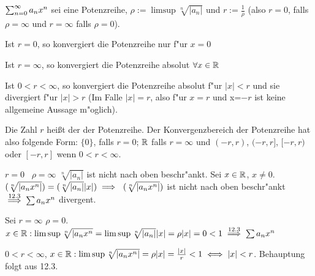 \documentclass[a4paper,twoside,DIV15,BCOR12mm]{scrbook}
\begin{document}
\begin{satz}
$\sum_{n=0}^{\infty}{a_nx^n}$ sei eine Potenzreihe, $\rho:=\limsup \sqrt[n]{|a_n|}$ und $r:=\frac{1}{\rho}$ (also $r=0$, falls $\rho=\infty$ und $r=\infty$ falls $\rho=0$).
\begin{liste}
\item Ist $r=0$, so konvergiert die Potenzreihe nur f"ur $x=0$
\item Ist $r=\infty$, so konvergiert die Potenzreihe absolut $\forall x\in\mathbb{R}$
\item Ist $0<r<\infty$, so konvergiert die Potenzreihe absolut f"ur $|x|<r$ und sie divergiert f"ur $|x|>r$
(Im Falle $|x|=r$, also f"ur $x=r$ und x=$-r$ ist keine allgemeine Aussage m"oglich).
\end{liste}
Die Zahl $r$ heißt der  der Potenzreihe. Der Konvergenzbereich der Potenzreihe hat also folgende Form: $\{0\}$, falls $r=0$; $\mathbb{R}$ falls $r=\infty$ und $(-r, r)$, $(-r, r]$, $[-r, r)$ oder $[-r, r]$ wenn $0<r<\infty$.
\end{satz}

\begin{beweise}
\item $r=0$ \folgt\ $\rho=\infty$ \folgt $\sqrt[n]{|a_n|}$ ist nicht nach oben beschr"ankt. Sei $x\in\mathbb{R}$, $x\ne0$.
$(\sqrt[n]{|a_nx^n|})=(\sqrt[n]{|a_n|}|x|) \implies\ (\sqrt[n]{|a_nx^n|})$ ist nicht nach oben beschr"ankt $\overset{\text{12.3}}{\implies} \sum{a_nx^n}$ divergent.
\item Sei $r=\infty$ \folgt $\rho=0$. $x\in\mathbb{R} : \limsup \sqrt[n]{|a_nx^n}=\limsup \sqrt[n]{|a_n|}|x|=\rho|x|=0<1 \overset{\text{12.3}}{\implies} \sum{a_nx^n}$
\item $0<r<\infty$, $x\in\mathbb{R}: \limsup \sqrt[n]{|a_nx^n|} = \rho |x| = \frac{|x|}{r}<1 \iff |x| < r$. Behauptung folgt aus 12.3.
\end{beweise}
\end{document}
